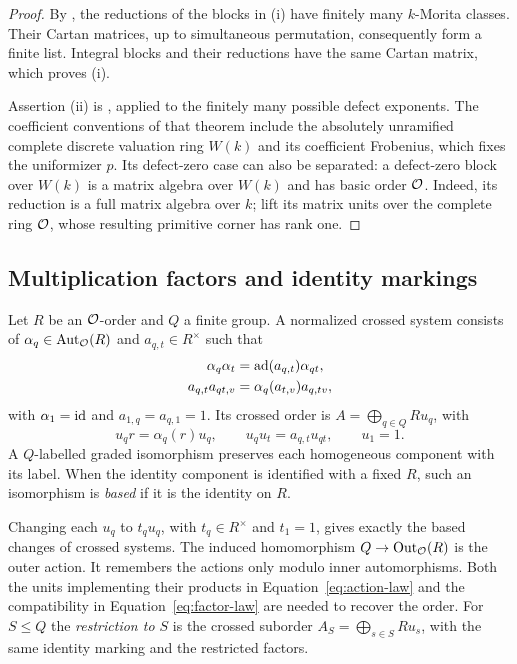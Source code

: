 \begin{proof}
By \cite[Theorem~1.1]{OpenAIFieldDonovan2026}, the reductions of the
blocks in (i) have finitely many $k$-Morita classes.  Their Cartan
matrices, up to simultaneous permutation, consequently form a finite
list.  Integral blocks and their reductions have the same Cartan
matrix, which proves (i).

Assertion (ii) is \cite[Theorem~3.10]{EEL2020}, applied to the
finitely many possible defect exponents.  The coefficient conventions
of that theorem include the absolutely unramified complete discrete
valuation ring $W(k)$ and its coefficient Frobenius, which fixes the
uniformizer $p$.
Its defect-zero case can also be separated: a defect-zero block over
$W(k)$ is a matrix algebra over $W(k)$ and has basic order $\mathcal O$.
Indeed, its reduction is a full matrix algebra over $k$; lift its
matrix units over the complete ring $\mathcal O$, whose resulting primitive
corner has rank one.
\end{proof}

\subsection{Multiplication factors and identity markings}

\begin{definition}
Let $R$ be an $\mathcal O$-order and $Q$ a finite group.  A normalized
crossed system consists of $\alpha_q\in\operatorname{Aut}_{\mathcal O}(R)$ and
$a_{q,t}\in R^\times$ such that
\begin{align}
 \alpha_q\alpha_t&=\operatorname{ad}(a_{q,t})\alpha_{qt},
       \label{eq:action-law}\\
 a_{q,t}a_{qt,v}&=\alpha_q(a_{t,v})a_{q,tv},
       \label{eq:factor-law}
\end{align}
with $\alpha_1=\mathrm{id}$ and $a_{1,q}=a_{q,1}=1$.
Its crossed order is $A=\bigoplus_{q\in Q}Ru_q$, with
\[
 u_qr=\alpha_q(r)u_q,\qquad
 u_qu_t=a_{q,t}u_{qt},\qquad u_1=1.
\]
A $Q$-labelled graded isomorphism preserves each homogeneous
component with its label.  When the identity component is identified
with a fixed $R$, such an isomorphism is \emph{based} if it is the
identity on $R$.
\end{definition}

Changing each $u_q$ to $t_qu_q$, with $t_q\in R^\times$ and
$t_1=1$, gives exactly the based changes of crossed systems.  The
induced homomorphism $Q\to\operatorname{Out}_{\mathcal O}(R)$ is the outer action.
It remembers the actions only modulo inner automorphisms.  Both the
units implementing their products in Equation~\eqref{eq:action-law}
and the compatibility in Equation~\eqref{eq:factor-law} are needed to
recover the order.  For $S\leq Q$ the \emph{restriction to $S$} is
the crossed suborder $A_S=\bigoplus_{s\in S}Ru_s$, with the same
identity marking and the restricted factors.

